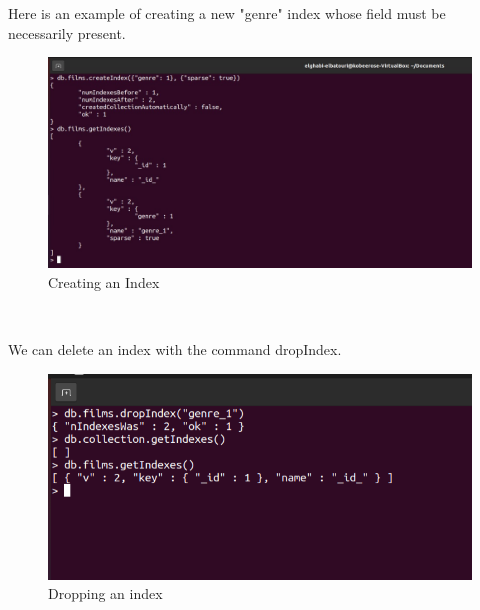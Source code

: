 \begin{spacing}{0.9}
\par Here is an example of creating a new "genre" index whose field must be
necessarily present.
\\
\begin{figure}[!htb] 
\begin{center} 
\includegraphics[width=1\linewidth]{Pictures/MongoDB/Examining MongoDB Query Features/Index management/Creating an Index} 
\end{center} 
\caption{Creating an Index} 
\end{figure}  \FloatBarrier
\\
\newpage
\par We can delete an index with the command dropIndex.
\\
\begin{figure}[!htb] 
\begin{center} 
\includegraphics[width=1\linewidth]{Pictures/MongoDB/Examining MongoDB Query Features/Index management/Dropping an index} 
\end{center} 
\caption{Dropping an index} 
\end{figure}  \FloatBarrier
\\


\end{spacing}
